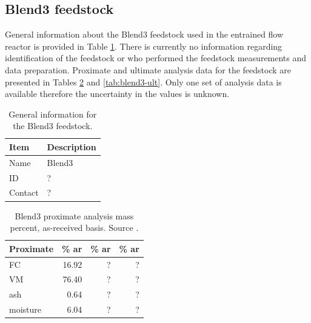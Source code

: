 \subsection{Blend3 feedstock}

General information about the Blend3 feedstock used in the entrained flow reactor is provided in Table \ref{tab:blend3-info}. There is currently no information regarding identification of the feedstock or who performed the feedstock measurements and data preparation. Proximate and ultimate analysis data for the feedstock are presented in Tables \ref{tab:blend3-prox} and \ref{tab:blend3-ult}. Only one set of analysis data is available therefore the uncertainty in the values is unknown.

\begin{table}[H]
    \centering
    \caption{General information for the Blend3 feedstock.}
    \label{tab:blend3-info}
    \begin{tabular}{ll}
        \toprule
        Item    & Description \\
        \midrule
        Name    & Blend3 \\
        ID      & ? \\
        Contact & ? \\
        \bottomrule
    \end{tabular}
\end{table}

\begin{table}[H]
    \centering
    \caption{Blend3 proximate analysis mass percent, as-received basis. Source \cite{Choratch-2017}.}
    \label{tab:blend3-prox}
    \begin{tabular}{lrrr}
        \toprule
        Proximate & \% ar & \% ar & \% ar \\
        \midrule
        FC        & 16.92 & ? & ? \\
        VM        & 76.40 & ? & ? \\
        ash       & 0.64  & ? & ? \\
        moisture  & 6.04  & ? & ? \\
        \bottomrule
    \end{tabular}
\end{table}

